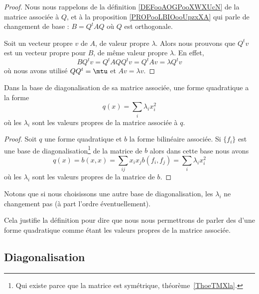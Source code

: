\begin{proof}
	Nous nous rappelons de la définition \ref{DEFooAOGPooXWXUcN} de la matrice associée à \( Q\), et à la proposition \ref{PROPooLBIOooUpzxXA} qui parle de changement de base : \( B=Q^tAQ\) où \( Q\) est orthogonale.

	Soit un vecteur propre \( v\) de \(A \), de valeur propre \( \lambda\). Alors nous prouvons que \( Q^tv\) est un vecteur propre pour \( B\), de même valeur propre \( \lambda\). En effet,
	\begin{equation}
		BQ^tv=Q^tAQQ^tv=Q^tAv=\lambda Q^tv
	\end{equation}
	où nous avons utilisé \( QQ^t=\mtu\) et \( Av=\lambda v\).
\end{proof}

\begin{proposition}\label{PropFWYooQXfcVY}
	Dans la base de diagonalisation de sa matrice associée, une forme quadratique a la forme
	\begin{equation}
		q(x)=\sum_i\lambda_ix_i^2
	\end{equation}
	où les \( \lambda_i\) sont les valeurs propres de la matrice associée à \( q\).
\end{proposition}

\begin{proof}
	Soit \( q\) une forme quadratique et \( b\) la forme bilinéaire associée. Si \( \{ f_i \}\) est une base de diagonalisation\footnote{Qui existe parce que la matrice est symétrique, théorème~\ref{ThoeTMXla}.} de la matrice de \( b\) alors dans cette base nous avons
	\begin{equation}
		q(x)=b(x,x)=\sum_{ij}x_ix_jb(f_i,f_j)=\sum_i\lambda_ix_i^2
	\end{equation}
	où les \( \lambda_i\) sont les valeurs propres de la matrice de \( b\).
\end{proof}

Notons que si nous choisissons une autre base de diagonalisation, les \( \lambda_i\) ne changement pas (à part l'ordre éventuellement).

Cela justifie la définition pour dire que nous nous permettrons de parler des  d'une forme quadratique comme étant les valeurs propres de la matrice associée.

\subsection{Diagonalisation}

